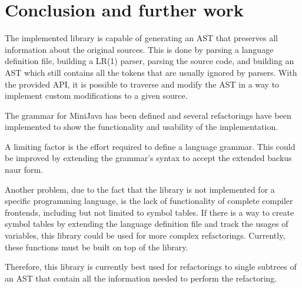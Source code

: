\section{Conclusion and further work}

The implemented library is capable of generating an AST that preserves all information about the original sources.
This is done by parsing a language definition file, building a LR(1) parser, parsing the source code, and building an AST
which still contains all the tokens that are usually ignored by parsers.
With the provided API, it is possible to traverse and modify the AST in a way to implement custom modifications to a given source.

The grammar for MiniJava has been defined and several refactorings have been implemented to show the functionality and usability of the implementation.

A limiting factor is the effort required to define a language grammar. This could be improved by extending the grammar's
syntax to accept the extended backus naur form.

Another problem, due to the fact that the library is not implemented for a specific programming language, is the lack of 
functionality of complete compiler frontends, including but not limited to symbol tables. If there is a way to 
create symbol tables by extending the language definition file and track the usages of variables, this library could be used for more complex refactorings.
Currently, these functions must be built on top of the library.

Therefore, this library is currently best used for refactorings to single subtrees of an AST that contain all the information needed to perform the refactoring.